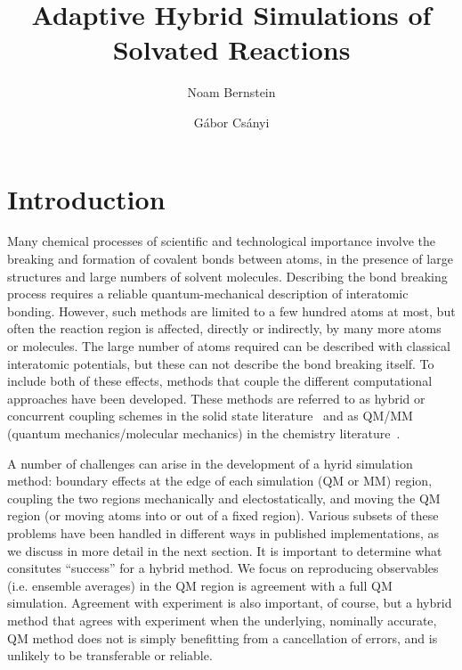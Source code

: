 \documentclass[11pt]{revtex4}
\begin{document}
\title{Adaptive Hybrid Simulations of Solvated Reactions}

\author{Noam Bernstein}

\author{G\'abor Cs\'anyi}

\maketitle

\section{Introduction}

Many chemical processes of scientific and technological importance
involve the breaking and formation of covalent bonds between atoms,
in the presence of large structures and large numbers of solvent
molecules.  Describing the bond breaking process requires a reliable
quantum-mechanical description of interatomic bonding.  However,
such methods are limited to a few hundred atoms at most, but often
the reaction region is affected, directly or indirectly, by many
more atoms or molecules.  The large number of atoms required can
be described with classical interatomic potentials, but these can
not describe the bond breaking itself.  To include both of these
effects, methods that couple the different computational approaches
have been developed.  These methods are referred to as hybrid or
concurrent coupling schemes in the solid state
literature~\cite{curtin_model_simul_mater_sci_eng_2003a,csanyi_j_phys_condens_mater_2005a,bernstein_rep_prog_phys_2009a} and
as QM/MM (quantum mechanics/molecular mechanics) in the chemistry
literature~\cite{senn_topics_cur_chem_2007a,lin_theor_chem_acc_2005a}.

A number of challenges can arise in the development of a hyrid
simulation method: boundary effects at the edge of each simulation
(QM or MM) region, coupling the two regions mechanically and
electostatically, and moving the QM region (or moving atoms into
or out of a fixed region).  Various subsets of these problems have
been handled in different ways in published implementations, as we
discuss in more detail in the next section.  It is important to
determine what consitutes ``success'' for a hybrid method.  We
focus on reproducing observables (i.e. ensemble averages) in the
QM region is agreement with a full QM simulation.  Agreement with
experiment is also important, of course, but a hybrid method that 
agrees with experiment when the underlying, nominally accurate,
QM method does not is simply benefitting from a cancellation of
errors, and is unlikely to be transferable or reliable.
\end{document}
